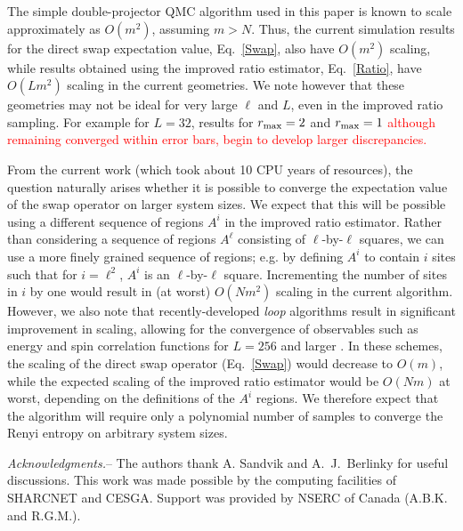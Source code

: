 \documentclass[prl,aps,twocolumn,floatfix,amsmath,amssymb,superscriptaddress,tightenlines]{revtex4}
\begin{document}
The simple double-projector QMC algorithm used in this paper is known to scale approximately as $O(m^2)$, \cite{AWSloop}
assuming $m >N$.
Thus, the current simulation results for the direct swap expectation
value, Eq.~\eqref{Swap}, also have
 $O(m^2)$ scaling, while results obtained using the improved ratio
estimator, Eq.~\eqref{Ratio}, have $O(Lm^2)$ scaling in the current geometries.
We note however that these geometries may not be ideal for very large $\ell$ and $L$, even in the improved ratio sampling.
For example for $L=32$, results for $r_{\rm max}=2$ and $r_{\rm max}=1$ 
\textcolor{red}{although remaining converged within error bars,
begin to develop larger discrepancies.
}

From the current work (which took about 10 CPU years of resources), 
the question naturally arises whether it is possible to converge the expectation value of the swap operator on
larger system sizes. 
We expect that this will be possible using a different
sequence of regions $A^i$ in the improved ratio estimator.
Rather than considering a sequence of regions $A^{\ell}$ consisting of $\ell$-by-$\ell$ squares, 
we can use a more finely grained sequence of regions; e.g. by defining $A^i$ to contain
$i$ sites such that for $i=\ell^2$, $A^i$ is an $\ell$-by-$\ell$ square.  Incrementing the number of sites in $i$ by one would result in
(at worst) $O(Nm^2)$ scaling in the current algorithm.  
However, we also note that recently-developed {\it loop} algorithms
result in significant improvement in scaling, allowing for the convergence of observables such as energy and spin correlation functions for $L=256$ and larger \cite{AWSloop}.  In these schemes, the scaling of the direct swap operator (Eq.~\eqref{Swap}) 
would decrease to $O(m)$, while the expected scaling of the improved ratio estimator would be $O(Nm)$ at worst, depending
on the definitions of the $A^i$ regions.
We therefore expect that the algorithm will require only a polynomial number of samples to converge the Renyi entropy on arbitrary system sizes.


{\it Acknowledgments.}-- The authors thank A. Sandvik and A.~J.~Berlinky for useful discussions.
This work was made possible by the
computing facilities of SHARCNET and CESGA.  Support was provided by NSERC
of Canada (A.B.K. and R.G.M.).


\end{document}
